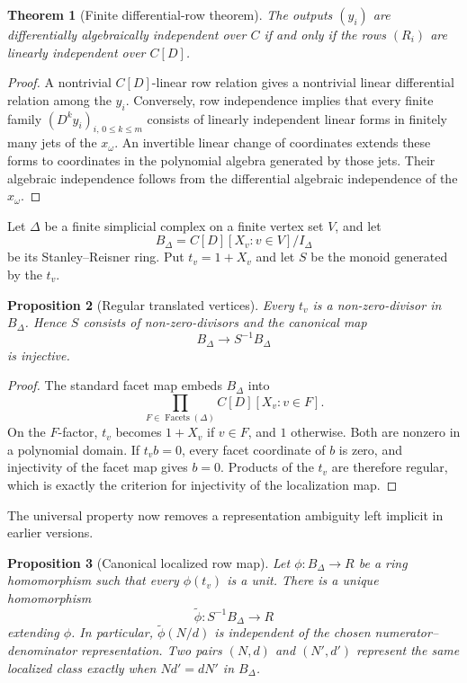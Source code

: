 \documentclass[11pt]{article}
\newtheorem{theorem}{Theorem}[section]
\newtheorem{proposition}[theorem]{Proposition}
\theoremstyle{definition}
\theoremstyle{remark}
\begin{document}
\begin{theorem}[Finite differential-row theorem]\label{thm:row-theorem}
The outputs \((y_i)\) are differentially algebraically independent over \(C\) if and only
if the rows \((R_i)\) are linearly independent over \(C[D]\).
\end{theorem}

\begin{proof}
A nontrivial \(C[D]\)-linear row relation gives a nontrivial linear differential relation
among the \(y_i\).  Conversely, row independence implies that every finite family
\((D^ky_i)_{i,\,0\leq k\leq m}\) consists of linearly independent linear forms in finitely
many jets of the \(x_\omega\).  An invertible linear change of coordinates extends these
forms to coordinates in the polynomial algebra generated by those jets.  Their algebraic
independence follows from the differential algebraic independence of the \(x_\omega\).
\end{proof}

Let \(\Delta\) be a finite simplicial complex on a finite vertex set \(V\), and let
\[
  B_\Delta=C[D][X_v:v\in V]/I_\Delta
\]
be its Stanley--Reisner ring.  Put \(t_v=1+X_v\) and let \(S\) be the monoid generated by
the \(t_v\).

\begin{proposition}[Regular translated vertices]\label{prop:regular-translate}
Every \(t_v\) is a non-zero-divisor in \(B_\Delta\).  Hence \(S\) consists of
non-zero-divisors and the canonical map
\[
  B_\Delta\longrightarrow S^{-1}B_\Delta
\]
is injective.
\end{proposition}

\begin{proof}
The standard facet map embeds \(B_\Delta\) into
\[
  \prod_{F\in\operatorname{Facets}(\Delta)}
    C[D][X_v:v\in F].
\]
On the \(F\)-factor, \(t_v\) becomes \(1+X_v\) if \(v\in F\), and \(1\) otherwise.
Both are nonzero in a polynomial domain.  If \(t_vb=0\), every facet coordinate of \(b\)
is zero, and injectivity of the facet map gives \(b=0\).  Products of the \(t_v\) are
therefore regular, which is exactly the criterion for injectivity of the localization map.
\end{proof}

The universal property now removes a representation ambiguity left implicit in earlier
versions.

\begin{proposition}[Canonical localized row map]\label{prop:canonical-localized-map}
Let \(\phi:B_\Delta\to R\) be a ring homomorphism such that every \(\phi(t_v)\) is a
unit.  There is a unique homomorphism
\[
  \widetilde\phi:S^{-1}B_\Delta\to R
\]
extending \(\phi\).  In particular, \(\widetilde\phi(N/d)\) is independent of the chosen
numerator--denominator representation.  Two pairs \((N,d)\) and \((N',d')\) represent the
same localized class exactly when \(Nd'=dN'\) in \(B_\Delta\).
\end{proposition}
\end{document}
